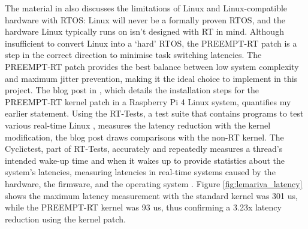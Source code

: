The material in  \cite{bootlinUnderstandingLinuxRealtime2024} also discusses the limitations of Linux and Linux-compatible hardware with RTOS: Linux will never be a formally proven RTOS, and the hardware Linux typically runs on isn't designed with RT in mind. Although insufficient to convert Linux into a `hard' RTOS, the PREEMPT-RT patch is a step in the correct direction to minimise task switching latencies. The PREEMPT-RT patch provides the best balance between low system complexity and maximum jitter prevention, making it the ideal choice to implement in this project. The blog post in \cite{maurorivaRaspberryPi4B2019}, which details the installation steps for the PREEMPT-RT kernel patch in a Raspberry Pi 4 Linux system, quantifies my earlier statement. Using the RT-Tests, a test suite that contains programs to test various real-time Linux \cite{costashulRTTests2023}, measures the latency reduction with the kernel modification, the blog post \cite{maurorivaRaspberryPi4B2019} draws comparisons with the non-RT kernel. The Cyclictest, part of RT-Tests, accurately and repeatedly measures a thread's intended wake-up time and when it wakes up to provide statistics about the system's latencies, measuring latencies in real-time systems caused by the hardware, the firmware, and the operating system \cite{costashulCyclictest2023}. Figure \ref{fig:lemariva_latency} shows the maximum latency measurement with the standard kernel was 301 us, while the PREEMPT-RT kernel was 93 us, thus confirming a 3.23x latency reduction using the kernel patch.

